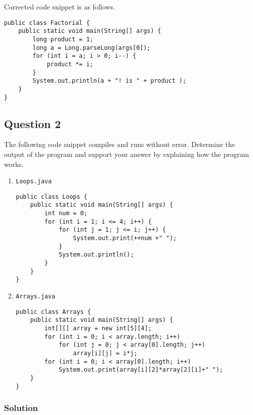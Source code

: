 Corrected code snippet is as follows.

\lstset{language=java, tabsize=2}
\begin{lstlisting}
public class Factorial {
	public static void main(String[] args) {
		long product = 1;
		long a = Long.parseLong(args[0]);
		for (int i = a; i > 0; i--) {
			product *= i;
		}
		System.out.println(a + "! is " + product );
	}
}
\end{lstlisting}

\subsection*{Question 2}
The following code snippet compiles and runs without error. Determine the output of the program and support your answer by explaining how the program works.

\begin{enumerate}[label=(\alph*)]
\item \texttt{Loops.java}
\lstset{language=java, tabsize=2}
\begin{lstlisting}
public class Loops {
	public static void main(String[] args) {
		int num = 0;
		for (int i = 1; i <= 4; i++) {
			for (int j = 1; j <= i; j++) {
				System.out.print(++num +" ");
			}
			System.out.println();
		}
	}
}
\end{lstlisting}
\item \texttt{Arrays.java}
\lstset{language=java, tabsize=2}
\begin{lstlisting}
public class Arrays {
	public static void main(String[] args) {
		int[][] array = new int[5][4];
		for (int i = 0; i < array.length; i++)
			for (int j = 0; j < array[0].length; j++)
				array[i][j] = i*j;
		for (int i = 0; i < array[0].length; i++)
			System.out.print(array[i][2]*array[2][i]+" ");
	}
}
\end{lstlisting}
\end{enumerate}

\subsubsection*{Solution}

